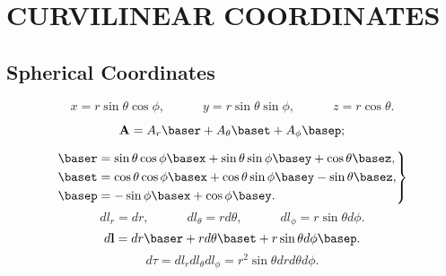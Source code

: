 \section{CURVILINEAR COORDINATES}

\subsection{Spherical Coordinates}
\begin{equation}
    x = r \sin \theta\cos\phi,\quad\quad\quad y = r\sin\theta\sin\phi,\quad\quad\quad z = r\cos\theta.
\end{equation}

\begin{equation}
    \mathbf{A} = A_r\baser + A_\theta\baset + A_\phi\basep;
\end{equation}

\begin{equation}
    \left.
    \begin{aligned}
        \baser &= \sin\theta\cos\phi\basex + \sin\theta\sin\phi\basey + \cos\theta\basez, \\
        \baset &= \cos\theta\cos\phi\basex + \cos\theta\sin\phi\basey - \sin\theta\basez,\\
        \basep &= -\sin\phi\basex + \cos\phi\basey.
    \end{aligned}
    \right\}
\end{equation}
\begin{equation}
    dl_r = dr,\quad\quad\quad dl_\theta = rd\theta,\quad\quad\quad dl_\phi=r\sin\theta d\phi.
\end{equation}
\begin{equation}
    d\mathbf{l} = dr\baser + rd\theta\baset + r\sin\theta d\phi\basep.
\end{equation}
\begin{equation}
    d\tau = dl_rdl_\theta dl_\phi = r^2\sin\theta dr d\theta d\phi.
\end{equation}

